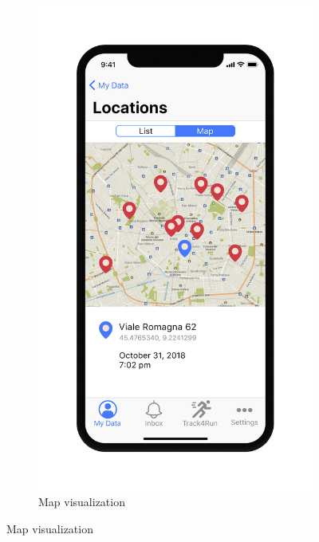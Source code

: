 \begin{figure}
\begin{subfigure}[b]{0.4\textwidth}
    \includegraphics[scale=0.2,keepaspectratio]{rasdL/Pictures/Mockup/mobile/location2.png}
    \captionsetup{labelformat=empty}
    \caption{Map visualization}
    \label{fig:2}
  \end{subfigure}
\end{figure}

